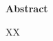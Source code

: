 \thispagestyle{empty}


\vspace*{1cm}

\begin{center}
    \textbf{Abstract}
\end{center}

\vspace*{1cm}

\noindent 
XX

